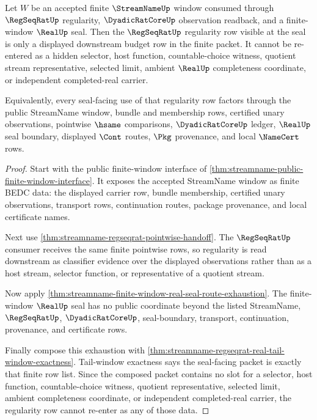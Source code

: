 \begin{theorem}
\label{thm:streamname-finite-window-regularity-selector-nonchoice}
Let $W$ be an accepted finite $\StreamNameUp$ window consumed through $\RegSeqRatUp$ regularity, $\DyadicRatCoreUp$ observation readback, and a finite-window $\RealUp$ seal. Then the $\RegSeqRatUp$ regularity row visible at the seal is only a displayed downstream budget row in the finite packet. It cannot be re-entered as a hidden selector, host function, countable-choice witness, quotient stream representative, selected limit, ambient $\RealUp$ completeness coordinate, or independent completed-real carrier.

Equivalently, every seal-facing use of that regularity row factors through the public StreamName window, bundle and membership rows, certified unary observations, pointwise $\hsame$ comparisons, $\DyadicRatCoreUp$ ledger, $\RealUp$ seal boundary, displayed $\Cont$ routes, $\Pkg$ provenance, and local $\NameCert$ rows.
\end{theorem}
\begin{proof}
Start with the public finite-window interface of \autoref{thm:streamname-public-finite-window-interface}. It exposes the accepted StreamName window as finite BEDC data: the displayed carrier row, bundle membership, certified unary observations, transport rows, continuation routes, package provenance, and local certificate names.

Next use \autoref{thm:streamname-regseqrat-pointwise-handoff}. The $\RegSeqRatUp$ consumer receives the same finite pointwise rows, so regularity is read downstream as classifier evidence over the displayed observations rather than as a host stream, selector function, or representative of a quotient stream.

Now apply \autoref{thm:streamname-finite-window-real-seal-route-exhaustion}. The finite-window $\RealUp$ seal has no public coordinate beyond the listed StreamName, $\RegSeqRatUp$, $\DyadicRatCoreUp$, seal-boundary, transport, continuation, provenance, and certificate rows.

Finally compose this exhaustion with \autoref{thm:streamname-regseqrat-real-tail-window-exactness}. Tail-window exactness says the seal-facing packet is exactly that finite row list. Since the composed packet contains no slot for a selector, host function, countable-choice witness, quotient representative, selected limit, ambient completeness coordinate, or independent completed-real carrier, the regularity row cannot re-enter as any of those data.
\end{proof}


